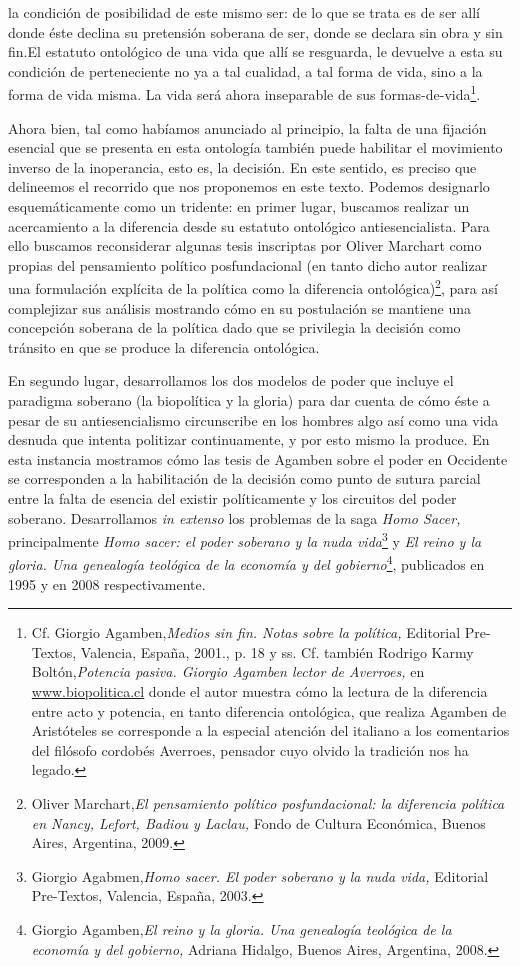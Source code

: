 la condición de posibilidad de este mismo ser: de lo que se trata es de ser allí donde éste declina su pretensión soberana de ser, donde se declara sin obra y sin fin.El estatuto ontológico de una vida que allí se resguarda, le devuelve a esta su condición de perteneciente no ya a tal cualidad, a tal forma de vida, sino a la forma de vida misma. La vida será ahora inseparable de sus formas-de-vida\footnote{Cf. Giorgio Agamben,\emph{Medios sin fin. Notas sobre la política,} Editorial Pre-Textos, Valencia, España, 2001., p. 18 y ss. Cf. también Rodrigo Karmy Boltón,\emph{Potencia pasiva. Giorgio Agamben lector de Averroes,} en \href{http://www.biopolitica.cl/}{www.biopolitica.cl} donde el autor muestra cómo la lectura de la diferencia entre acto y potencia, en tanto diferencia ontológica, que realiza Agamben de Aristóteles se corresponde a la especial atención del italiano a los comentarios del filósofo cordobés Averroes, pensador cuyo olvido la tradición nos ha legado.}.

Ahora bien, tal como habíamos anunciado al principio, la falta de una fijación esencial que se presenta en esta ontología también puede habilitar el movimiento inverso de la inoperancia, esto es, la decisión. En este sentido, es preciso que delineemos el recorrido que nos proponemos en este texto. Podemos designarlo esquemáticamente como un tridente: en primer lugar, buscamos realizar un acercamiento a la diferencia desde su estatuto ontológico antiesencialista. Para ello buscamos reconsiderar algunas tesis inscriptas por Oliver Marchart como propias del pensamiento político posfundacional (en tanto dicho autor realizar una formulación explícita de la política como la diferencia ontológica)\footnote{Oliver Marchart,\emph{El pensamiento político posfundacional: la diferencia política en Nancy, Lefort, Badiou y Laclau,} Fondo de Cultura Económica, Buenos Aires, Argentina, 2009.}, para así complejizar sus análisis mostrando cómo en su postulación se mantiene una concepción soberana de la política dado que se privilegia la decisión como tránsito en que se produce la diferencia ontológica.

En segundo lugar, desarrollamos los dos modelos de poder que incluye el paradigma soberano (la biopolítica y la gloria) para dar cuenta de cómo éste a pesar de su antiesencialismo circunscribe en los hombres algo así como una vida desnuda que intenta politizar continuamente, y por esto mismo la produce. En esta instancia mostramos cómo las tesis de Agamben sobre el poder en Occidente se corresponden a la habilitación de la decisión como punto de sutura parcial entre la falta de esencia del existir políticamente y los circuitos del poder soberano. Desarrollamos \emph{in extenso} los problemas de la saga \emph{Homo Sacer,} principalmente \emph{Homo sacer: el poder soberano y la nuda vida}\footnote{Giorgio Agabmen,\emph{Homo sacer. El poder soberano y la nuda vida,} Editorial Pre-Textos, Valencia, España, 2003.} y \emph{El reino y la gloria. Una genealogía teológica de la economía y del gobierno}\footnote{Giorgio Agamben,\emph{El reino y la gloria. Una genealogía teológica de la economía y del gobierno,} Adriana Hidalgo, Buenos Aires, Argentina, 2008.}, publicados en 1995 y en 2008 respectivamente.

